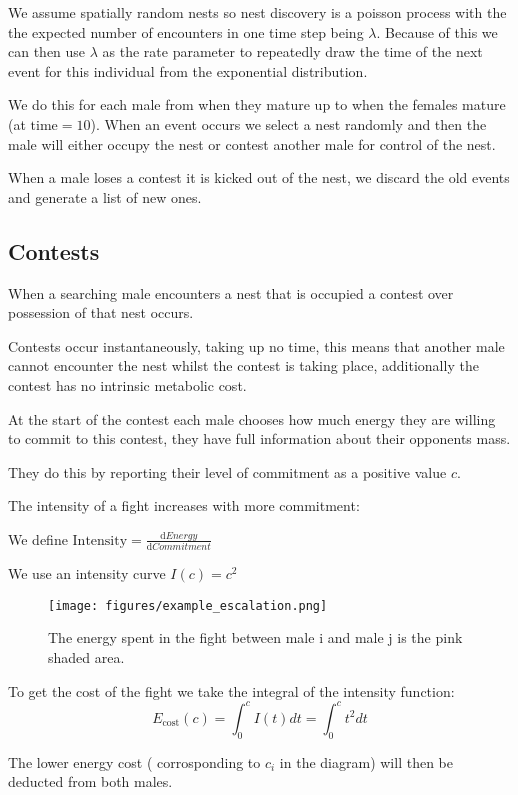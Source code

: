 \documentclass[a4paper,11pt]{article}
\begin{document}
We assume spatially random nests so nest discovery is a poisson process with the the expected number of encounters in one time step being $\lambda$.
Because of this we can then use $\lambda$ as the rate parameter to repeatedly draw the time of the next event for this individual from the exponential distribution.

We do this for each male from when they mature up to when the females mature (at $\text{time} = 10$).
When an event occurs we select a nest randomly and then the male will either occupy the nest or contest another male for control of the nest.

When a male loses a contest it is kicked out of the nest, we discard the old events and generate a list of new ones.

\clearpage

\subsection{Contests}
When a searching male encounters a nest that is occupied a contest over possession of that nest occurs.

Contests occur instantaneously, taking up no time, this means that another male cannot encounter the nest whilst the contest is taking place, additionally the contest has no intrinsic metabolic cost.

At the start of the contest each male chooses how much  energy they are willing to commit to this contest, they have full information about their opponents mass.

They do this by reporting their level of commitment as a positive value $c$.

The intensity of a fight increases with more commitment:

We define $\text{Intensity} = \frac{\text{d}Energy}{\text{d}Commitment}$

We use an intensity curve $I(c) = c^2$

\begin{figure}[h!]
    \centering
    \texttt{[image: figures/example\_escalation.png]}
    \caption{The energy spent in the fight between male i and male j is the pink shaded area.}
\end{figure}

To get the cost of the fight we take the integral of the intensity function:
$$E_\text{cost}(c) = \int_0^{c}{I(t)}dt = \int_0^{c}{t^2}dt $$

The lower energy cost ( corrosponding to $c_i$ in the diagram) will then be deducted from both males.
\end{document}
